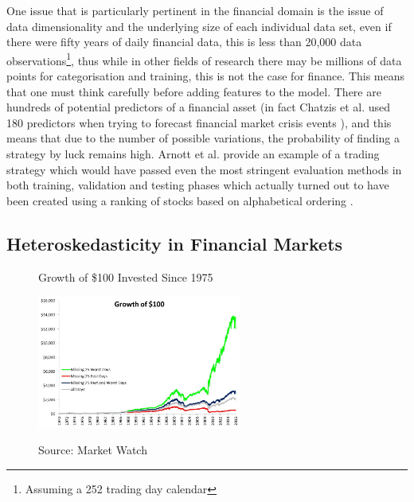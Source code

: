 \documentclass[11pt]{article}
\begin{document}
One issue that is particularly pertinent in the financial domain is the issue of data dimensionality and the underlying size of each individual data set, even if there were fifty years of daily financial data, this is less than 20,000 data observations\footnote{Assuming a 252 trading day calendar}, thus while in other fields of research there may be millions of data points for categorisation and training, this is not the case for finance. This means that one must think carefully before adding features to the model. There are hundreds of potential predictors of a financial asset (in fact Chatzis et al. used 180 predictors when trying to forecast financial market crisis events \cite{Chatzis2018}), and this means that due to the number of possible variations, the probability of finding a strategy by luck remains high. Arnott et al. provide an example of a trading strategy which would have passed even the most stringent evaluation methods in both training, validation and testing phases which actually turned out to have been created using a ranking of stocks based on alphabetical ordering \cite{Arnott2018}.

\subsection{Heteroskedasticity in Financial Markets}
\begin{figure}[h]
    \centering
	\caption{Growth of \$100 Invested Since 1975}
    \includegraphics[width=0.6\textwidth]{beststockdays}    
    \label{fig:beststockdays}
	\caption*{\small Source: Market Watch\cite{bestdays}}
\end{figure}
\end{document}
